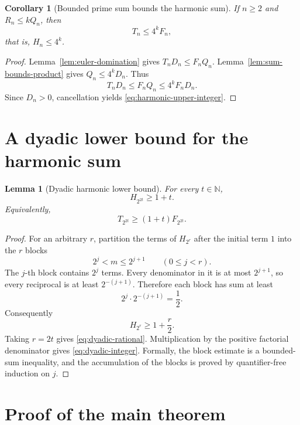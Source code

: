\documentclass[11pt]{article}
\newtheorem{lemma}[theorem]{Lemma}
\newtheorem{corollary}[theorem]{Corollary}
\theoremstyle{definition}
\newcommand{\N}{\mathbb{N}}
\newcommand{\ProdP}{Q}
\newcommand{\NumP}{R}
\newcommand{\DenE}{D}
\newcommand{\Fact}{F}
\newcommand{\NumH}{T}
\begin{document}
\begin{corollary}[Bounded prime sum bounds the harmonic sum]\label{cor:harmonic-upper}
If \(n\geq2\) and \(\NumP_n\leq k\ProdP_n\), then
\begin{equation}\label{eq:harmonic-upper-integer}
  \NumH_n\leq4^k\Fact_n,
\end{equation}
that is, \(H_n\leq4^k\).
\end{corollary}

\begin{proof}
Lemma~\ref{lem:euler-domination} gives
\(
 \NumH_n\DenE_n\leq\Fact_n\ProdP_n.
\)
Lemma~\ref{lem:sum-bounds-product} gives
\(
 \ProdP_n\leq4^k\DenE_n.
\)
Thus
\[
 \NumH_n\DenE_n
 \leq\Fact_n\ProdP_n
 \leq4^k\Fact_n\DenE_n.
\]
Since \(\DenE_n>0\), cancellation yields
\eqref{eq:harmonic-upper-integer}.
\end{proof}

\section{A dyadic lower bound for the harmonic sum}

\begin{lemma}[Dyadic harmonic lower bound]\label{lem:dyadic}
For every \(t\in\N\),
\begin{equation}\label{eq:dyadic-rational}
  H_{2^{2t}}\geq1+t.
\end{equation}
Equivalently,
\begin{equation}\label{eq:dyadic-integer}
  \NumH_{2^{2t}}\geq(1+t)\Fact_{2^{2t}}.
\end{equation}
\end{lemma}

\begin{proof}
For an arbitrary \(r\), partition the terms of \(H_{2^r}\) after the initial
term \(1\) into the \(r\) blocks
\[
  2^j<m\leq2^{j+1}\qquad(0\leq j<r).
\]
The \(j\)-th block contains \(2^j\) terms.  Every denominator in it is at most
\(2^{j+1}\), so every reciprocal is at least \(2^{-(j+1)}\).  Therefore each
block has sum at least
\[
  2^j\cdot2^{-(j+1)}=\frac12.
\]
Consequently
\[
  H_{2^r}\geq1+\frac r2.
\]
Taking \(r=2t\) gives \eqref{eq:dyadic-rational}.  Multiplication by the
positive factorial denominator gives \eqref{eq:dyadic-integer}.  Formally, the
block estimate is a bounded-sum inequality, and the accumulation of the
blocks is proved by quantifier-free induction on \(j\).
\end{proof}

\section{Proof of the main theorem}
\end{document}
